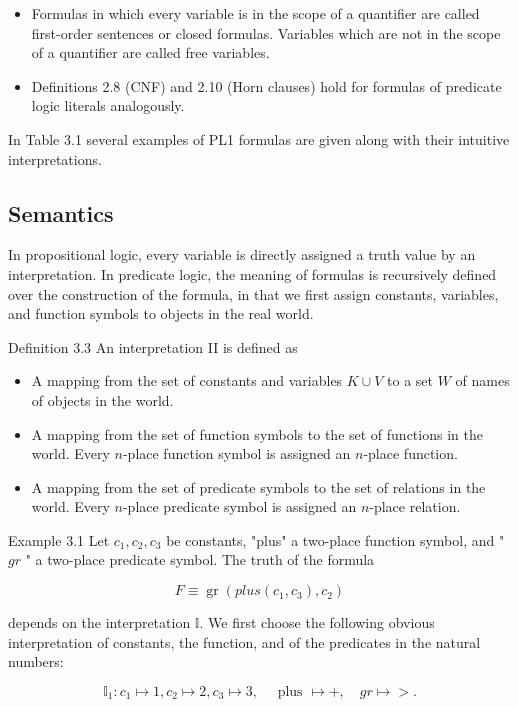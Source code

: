 \documentclass[10pt]{book}
\begin{document}
\begin{itemize}
  \item Formulas in which every variable is in the scope of a quantifier are called first-order sentences or closed formulas. Variables which are not in the scope of a quantifier are called free variables.
  \item Definitions 2.8 (CNF) and 2.10 (Horn clauses) hold for formulas of predicate logic literals analogously.
\end{itemize}
In Table 3.1 several examples of PL1 formulas are given along with their intuitive interpretations.

\subsection{Semantics}
In propositional logic, every variable is directly assigned a truth value by an interpretation. In predicate logic, the meaning of formulas is recursively defined over the construction of the formula, in that we first assign constants, variables, and function symbols to objects in the real world.

Definition 3.3 An interpretation II is defined as

\begin{itemize}
  \item A mapping from the set of constants and variables $K \cup V$ to a set $W$ of names of objects in the world.
  \item A mapping from the set of function symbols to the set of functions in the world. Every $n$-place function symbol is assigned an $n$-place function.
  \item A mapping from the set of predicate symbols to the set of relations in the world. Every $n$-place predicate symbol is assigned an $n$-place relation.
\end{itemize}

Example 3.1 Let $c_{1}, c_{2}, c_{3}$ be constants, "plus" a two-place function symbol, and " $g r$ " a two-place predicate symbol. The truth of the formula

$$
F \equiv \operatorname{gr}\left(p l u s\left(c_{1}, c_{3}\right), c_{2}\right)
$$

depends on the interpretation $\mathbb{I}$. We first choose the following obvious interpretation of constants, the function, and of the predicates in the natural numbers:

$$
\mathbb{I}_{1}: c_{1} \mapsto 1, c_{2} \mapsto 2, c_{3} \mapsto 3, \quad \text { plus } \mapsto+, \quad g r \mapsto>.
$$
\end{document}
